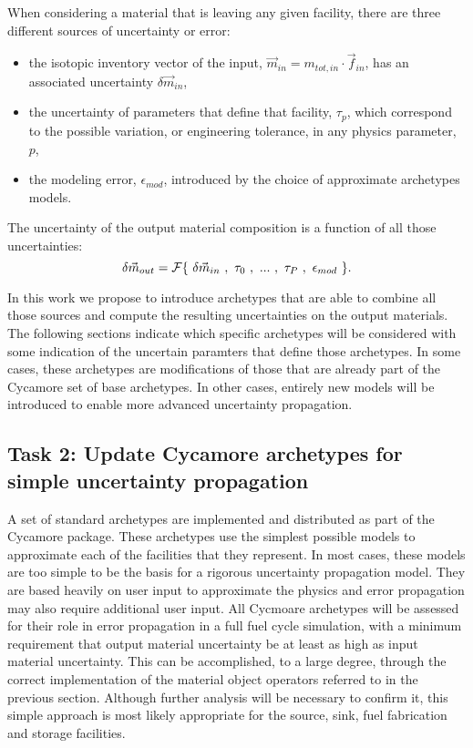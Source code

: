 \documentclass[dvips,12pt]{article}
\newcommand{\unc}[1]
{ \delta #1 }
\begin{document}
When considering a material that is leaving any
given facility, there are three different sources
of uncertainty or error:
\begin{itemize}
\item the isotopic inventory vector of the input,
  $\vec{m}_{in} = m_{tot,in} \cdot \vec{f}_{in}$,
  has an associated uncertainty $\unc{\vec{m}_{in}}$,
\item the uncertainty of parameters that define that
  facility, $\tau_{p}$, 
  which correspond to the possible
  variation, or engineering tolerance, in any physics parameter, $p$,
\item the modeling error, $\epsilon_{mod}$, introduced by
  the choice of approximate archetypes models.
\end{itemize}
The uncertainty of the output material composition is a
function of all those uncertainties:
\begin{equation}
  \delta \vec{m}_{out} = 
         {\cal F}\{~\unc{\vec{m}_{in}}~,~\tau_0~,~...~,~\tau_P~,~\epsilon_{mod}~\}.
\end{equation}

In this work we propose to introduce archetypes
that are able to combine all those sources and
compute the resulting uncertainties on the output
materials.  The following sections indicate which
specific archetypes will be considered with some
indication of the uncertain paramters that define
those archetypes.  In some cases, these archetypes
are modifications of those that are already part
of the Cycamore set of base archetypes.  In other
cases, entirely new models will be introduced to
enable more advanced uncertainty propagation.

\subsection{Task 2: Update Cycamore archetypes for simple uncertainty propagation}

A set of standard archetypes are implemented and
distributed as part of the Cycamore package.
These archetypes use the simplest possible models
to approximate each of the facilities that they
represent.  In most cases, these models are too
simple to be the basis for a rigorous uncertainty
propagation model.  They are based heavily on user
input to approximate the physics and error
propagation may also require additional user
input.  All Cycmoare archetypes will be assessed
for their role in error propagation in a full fuel
cycle simulation, with a minimum requirement that
output material uncertainty be at least as high as
input material uncertainty.  This can be
accomplished, to a large degree, through the
correct implementation of the material object
operators referred to in the previous section.
Although further analysis will be necessary to
confirm it, this simple approach is most likely
appropriate for the source, sink, fuel fabrication
and storage facilities.
\end{document}
